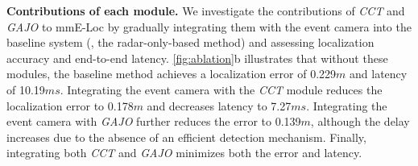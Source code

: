 \textbf{Contributions of each module.}
We investigate the contributions of \textit{CCT} and \textit{GAJO} to mmE-Loc by gradually integrating them with the event camera into the baseline system (\ie, the radar-only-based method) and assessing localization accuracy and end-to-end latency. 
\fig \ref{fig:ablation}b illustrates that without these modules, the baseline method achieves a localization error of 0.229$m$ and latency of 10.19$ms$.
Integrating the event camera with the \textit{CCT} module reduces the localization error to 0.178$m$ and decreases latency to 7.27$ms$. 
Integrating the event camera with \textit{GAJO} further reduces the error to 0.139$m$, although the delay increases due to the absence of an efficient detection mechanism. 
Finally, integrating both \textit{CCT} and \textit{GAJO} minimizes both the error and latency.


